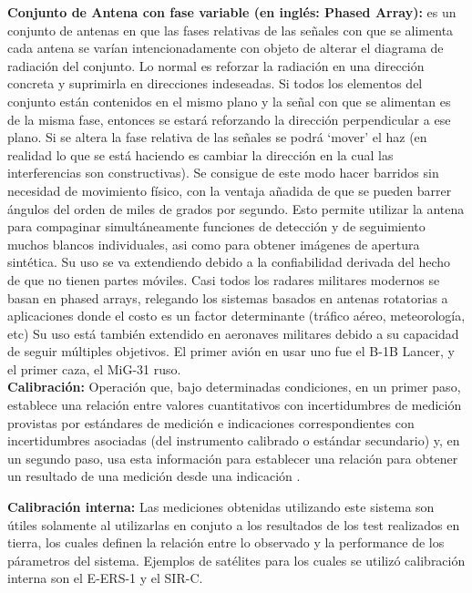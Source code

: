 {\textbf{Conjunto de Antena con fase variable (en inglés: Phased Array):}} es un conjunto de antenas en que las fases relativas
de las señales con que se alimenta cada antena se varían intencionadamente con objeto de alterar el diagrama de radiación del 
conjunto. Lo normal es reforzar la radiación en una dirección concreta y suprimirla en direcciones indeseadas. Si todos los 
elementos del conjunto están contenidos en el mismo plano y la señal con que se alimentan es de la misma fase, 
entonces se estará reforzando la dirección perpendicular a ese plano. Si se altera la fase relativa de las señales se podrá
\enquote*{mover} el haz (en realidad lo que se está haciendo es cambiar la dirección en la cual las interferencias son 
constructivas). Se consigue de este modo hacer barridos sin necesidad de movimiento físico, con la ventaja añadida de que 
se pueden barrer ángulos del orden de miles de grados por segundo. Esto permite utilizar la antena para compaginar 
simultáneamente funciones de detección y de seguimiento muchos blancos individuales, asi como para obtener imágenes de 
apertura sintética. Su uso se va extendiendo debido a la confiabilidad derivada del hecho de que no tienen partes móviles. 
Casi todos los radares militares modernos se basan en phased arrays, relegando los sistemas basados en antenas rotatorias a 
aplicaciones donde el costo es un factor determinante (tráfico aéreo, meteorología, etc) Su uso está también extendido en
aeronaves militares debido a su capacidad de seguir múltiples objetivos. El primer avión en usar uno fue el B-1B Lancer, y 
el primer caza, el MiG-31 ruso.\\

{\textbf{Calibración:}} Operación que, bajo determinadas condiciones, en un primer paso, establece una relación entre 
valores cuantitativos con incertidumbres de medición provistas por estándares de medición e indicaciones correspondientes
con incertidumbres asociadas (del instrumento calibrado o estándar secundario) y, en un segundo paso, usa
esta información para establecer una relación para obtener un resultado de una medición desde una indicación \cite{CalDef}.

{\textbf{Calibración interna:}} Las mediciones obtenidas utilizando este sistema son útiles solamente al utilizarlas en 
conjuto a los resultados de los test realizados en tierra, los cuales definen la relación entre lo observado y la 
performance de los párametros del sistema. Ejemplos de satélites para los cuales se utilizó calibración interna son el 
E-ERS-1 y el SIR-C.


